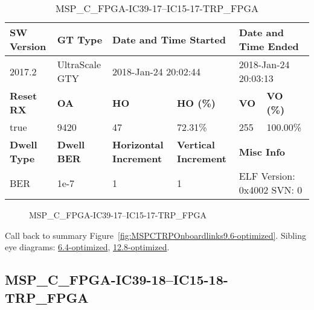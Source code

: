\begin{table}[h]
\centering
\caption{MSP\_C\_FPGA-IC39-17--IC15-17-TRP\_FPGA}
\label{tab:MSPCFPGAIC3917IC1517TRPFPGA9.6-optimized}
\begin{tabular}{@{}|l|l|l|l|l|l|@{}}
\toprule
\textbf{SW Version}                & \textbf{GT Type}   & \multicolumn{2}{l|}{\textbf{Date and Time Started}}            & \multicolumn{2}{l|}{\textbf{Date and Time Ended}}        \\ \midrule
2017.2                       & UltraScale GTY          & \multicolumn{2}{l|}{2018-Jan-24 20:02:44}                   & \multicolumn{2}{l|}{2018-Jan-24 20:03:13}               \\ \midrule
\textbf{Reset RX}                  & \textbf{OA} & \textbf{HO}   & \textbf{HO (\%)} & \textbf{VO} & \textbf{VO (\%)} \\ \midrule
true & 9420        & 47          & 72.31\%        & 255        & 100.00\%       \\ \midrule
\textbf{Dwell Type}                & \textbf{Dwell BER} & \textbf{Horizontal Increment} & \textbf{Vertical Increment}    & \multicolumn{2}{l|}{\textbf{Misc Info}}                  \\ \midrule
BER                            & 1e-7        & 1        & 1           & \multicolumn{2}{l|}{ELF Version: 0x4002 SVN: 0}                         \\ \bottomrule
\end{tabular}
\end{table}

\begin{figure}[h]
\caption{MSP\_C\_FPGA-IC39-17--IC15-17-TRP\_FPGA} \label{fig:MSPCFPGAIC3917IC1517TRPFPGA9.6-optimized}
\end{figure}

Call back to summary Figure~\ref{fig:MSPCTRPOnboardlinks9.6-optimized}.
Sibling eye diagrams: \hyperref[sec:MSPCFPGAIC3917IC1517TRPFPGA6.4-optimized]{6.4-optimized}, \hyperref[sec:MSPCFPGAIC3917IC1517TRPFPGA12.8-optimized]{12.8-optimized}.

\clearpage
\newpage


\subsection{MSP\_C\_FPGA-IC39-18--IC15-18-TRP\_FPGA}\label{sec:MSPCFPGAIC3918IC1518TRPFPGA9.6-optimized}

